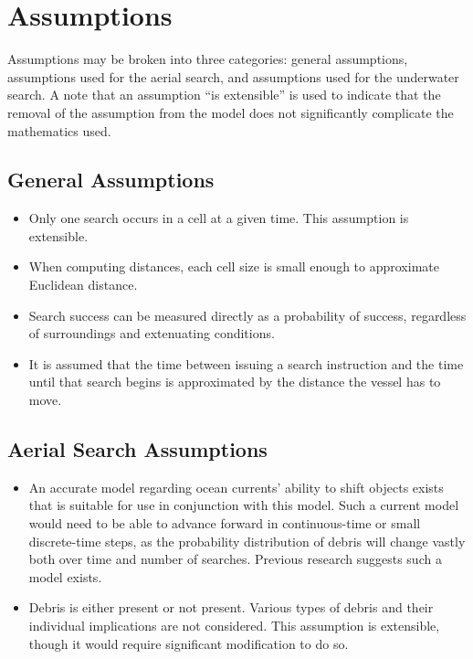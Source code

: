 \section{Assumptions}

Assumptions may be broken into three categories: general assumptions, assumptions used for the aerial search, and assumptions used for the underwater search. A note that an assumption ``is extensible'' is used to indicate that the removal of the assumption from the model does not significantly complicate the mathematics used.

\subsection{General Assumptions}

\begin{itemize}
\item Only one search occurs in a cell at a given time. This assumption is extensible.
\item When computing distances, each cell size is small enough to approximate Euclidean distance.
\item Search success can be measured directly as a probability of success, regardless of surroundings and extenuating conditions.
\item It is assumed that the time between issuing a search instruction and the time until that search begins is approximated by the distance the vessel has to move.
\end{itemize}

\subsection{Aerial Search Assumptions}

\begin{itemize}
\item An accurate model regarding ocean currents' ability to shift objects exists that is suitable for use in conjunction with this model. Such a current model would need to be able to advance forward in continuous-time or small discrete-time steps, as the probability distribution of debris will change vastly both over time and number of searches. Previous research suggests such a model exists.
\item Debris is either present or not present. Various types of debris and their individual implications are not considered. This assumption is extensible, though it would require significant modification to do so.
\end{itemize}


